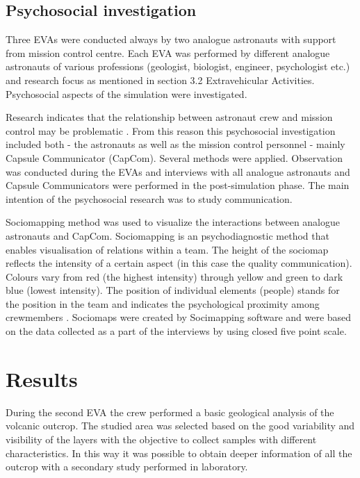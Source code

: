 \documentclass[preprint]{elsarticle}
\begin{document}
\subsection{Psychosocial investigation}
Three EVAs were conducted always by two analogue astronauts with support from mission control centre. Each EVA was performed by different analogue astronauts of various professions (geologist, biologist, engineer, psychologist etc.) and research focus as mentioned in section 3.2 Extravehicular Activities. Psychosocial aspects of the simulation were investigated.

Research indicates that the relationship between astronaut crew and mission control may be problematic \cite{ref21}\cite{ref22}. From this reason this psychosocial investigation included both - the astronauts as well as the mission control personnel - mainly Capsule Communicator (CapCom). Several methods were applied. Observation was conducted during the EVAs and interviews with all analogue astronauts and Capsule Communicators were performed in the post-simulation phase. The main intention of the psychosocial research was to study communication.

Sociomapping method \cite{ref20}\cite{ref23} was used to visualize the interactions between analogue astronauts and CapCom. Sociomapping is an psychodiagnostic method that enables visualisation of relations within a team. The height of the sociomap reflects the intensity of a certain aspect (in this case the quality communication). Colours vary from red (the highest intensity) through yellow and green to dark blue (lowest intensity). The position of individual elements (people) stands for the position in the team and indicates the psychological proximity among crewmembers \cite{ref20}\cite{ref23}. Sociomaps were created by Socimapping software \cite{ref20} and were based on the data collected as a part of the interviews by using closed five point scale.

\section{Results}
During the second EVA the crew performed a basic geological analysis of the volcanic outcrop. The studied area was selected based on the good variability and visibility of the layers with the objective to collect samples with different characteristics. In this way it was possible to obtain deeper information of all the outcrop with a secondary study performed in laboratory.
\end{document}
